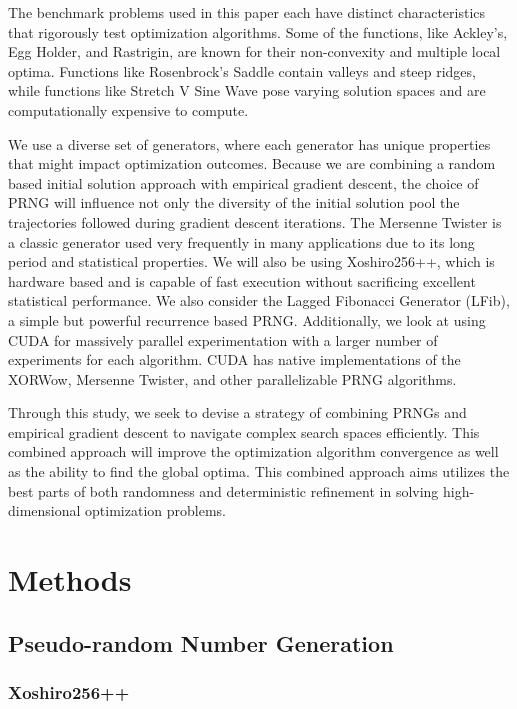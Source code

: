 \documentclass{article}
\begin{document}
        The benchmark problems used in this paper each have distinct characteristics that rigorously test optimization algorithms. Some of the functions, like Ackley’s, Egg Holder, and Rastrigin, are known for their non-convexity and multiple local optima. Functions like Rosenbrock’s Saddle contain valleys and steep ridges, while functions like Stretch V Sine Wave pose varying solution spaces and are computationally expensive to compute.

        We use a diverse set of generators, where each generator has unique properties that might impact optimization outcomes. Because we are combining a random based initial solution approach with empirical gradient descent, the choice of PRNG will influence not only the diversity of the initial solution pool the trajectories followed during gradient descent iterations. The Mersenne Twister is a classic generator used very frequently in many applications due to its long period and statistical properties. We will also be using Xoshiro256++, which is hardware based and is capable of fast execution without sacrificing excellent statistical performance. We also consider the Lagged Fibonacci Generator (LFib), a simple but powerful recurrence based PRNG. Additionally, we look at using CUDA for massively parallel experimentation with a larger number of experiments for each algorithm. CUDA has native implementations of the XORWow, Mersenne Twister, and other parallelizable PRNG algorithms.

        Through this study, we seek to devise a strategy of combining PRNGs and empirical gradient descent to navigate complex search spaces efficiently. This combined approach will improve the optimization algorithm convergence as well as the ability to find the global optima. This combined approach aims utilizes the best parts of both randomness and deterministic refinement in solving high-dimensional optimization problems.

    \section{Methods}

        \subsection{Pseudo-random Number Generation}

            \subsubsection{Xoshiro256++}
\end{document}
